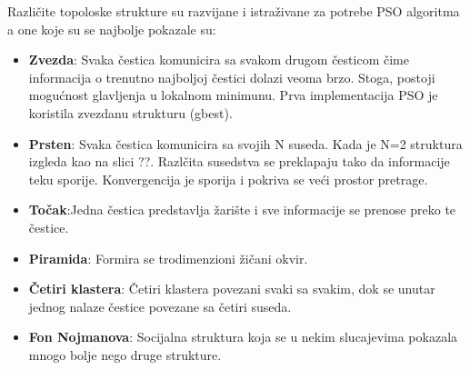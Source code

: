 \documentclass[a4paper]{article}
\begin{document}
Različite topoloske strukture su razvijane i istraživane za potrebe PSO algoritma a one koje su se najbolje pokazale su:
\begin{itemize}
    \item \textbf{Zvezda}: Svaka čestica komunicira sa svakom drugom česticom čime informacija o trenutno najboljoj čestici dolazi veoma brzo. Stoga, postoji mogućnost glavljenja u lokalnom minimunu. Prva implementacija PSO je koristila zvezdanu strukturu (gbest).
    \item \textbf{Prsten}: Svaka čestica komunicira sa svojih N suseda. Kada je N=2 struktura izgleda kao na slici ??. Razlčita susedstva se preklapaju tako da informacije teku sporije. Konvergencija je sporija i pokriva se veći prostor pretrage.
    \item \textbf{Točak}:Jedna čestica predstavlja žarište i sve informacije se prenose preko te čestice.
    \item \textbf{Piramida}: Formira se trodimenzioni žičani okvir.
    \item \textbf{Četiri klastera}: Četiri klastera povezani svaki sa svakim, dok se unutar jednog nalaze čestice povezane sa četiri suseda.
    \item \textbf{Fon Nojmanova}: Socijalna struktura koja se u nekim slucajevima pokazala mnogo bolje nego druge strukture.
\end{itemize}
\end{document}
